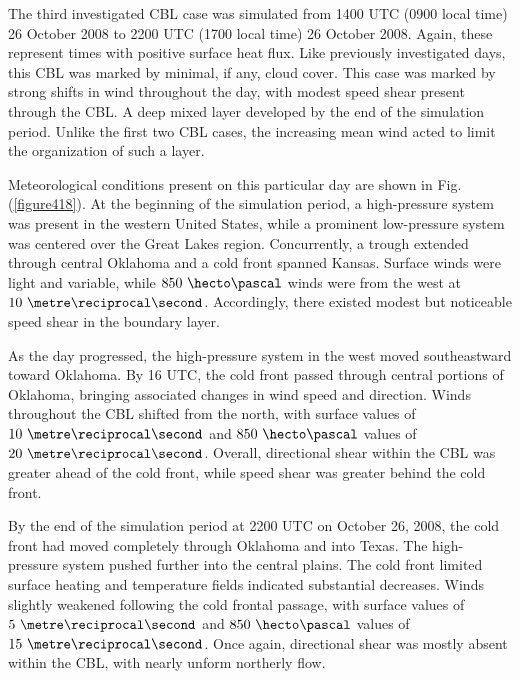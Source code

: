 The third investigated CBL case was simulated from 1400 UTC (0900 local time) 26 October 2008 to 2200 UTC (1700 local time) 26 October 2008. Again, these represent times with positive surface heat flux. Like previously investigated days, this CBL was marked by minimal, if any, cloud cover. This case was marked by strong shifts in wind throughout the day, with modest speed shear present through the CBL. A deep mixed layer developed by the end of the simulation period. Unlike the first two CBL cases, the increasing mean wind acted to limit the organization of such a layer. 

Meteorological conditions present on this particular day are shown in Fig. (\autoref{figure418}). At the beginning of the simulation period, a high-pressure system was present in the western United States, while a prominent low-pressure system was centered over the Great Lakes region. Concurrently, a trough extended through central Oklahoma and a cold front spanned Kansas. Surface winds were light and variable, while $850\mbox{ }\hecto\pascal$ winds were from the west at $10\mbox{ }\metre\reciprocal\second$. Accordingly, there existed modest but noticeable speed shear in the boundary layer. 

As the day progressed, the high-pressure system in the west moved southeastward toward Oklahoma. By 16 UTC, the cold front passed through central portions of Oklahoma, bringing associated changes in wind speed and direction. Winds throughout the CBL shifted from the north, with surface values of $10\mbox{ }\metre\reciprocal\second$ and $850\mbox{ }\hecto\pascal$ values of $20\mbox{ }\metre\reciprocal\second$. Overall, directional shear within the CBL was greater ahead of the cold front, while speed shear was greater behind the cold front.

By the end of the simulation period at 2200 UTC on October 26, 2008, the cold front had moved completely through Oklahoma and into Texas. The high-pressure system pushed further into the central plains. The cold front limited surface heating and temperature fields indicated substantial decreases. Winds slightly weakened following the cold frontal passage, with surface values of $5\mbox{ }\metre\reciprocal\second$ and $850\mbox{ }\hecto\pascal$ values of $15\mbox{ }\metre\reciprocal\second$. Once again, directional shear was mostly absent within the CBL, with nearly unform northerly flow.


